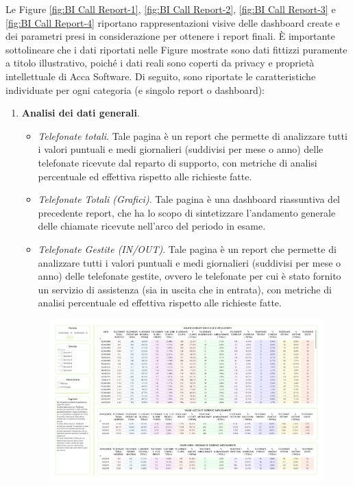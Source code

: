 Le Figure \ref{fig:BI Call Report-1}, \ref{fig:BI Call Report-2}, \ref{fig:BI Call Report-3} e \ref{fig:BI Call Report-4} riportano rappresentazioni visive delle dashboard create e dei parametri presi in considerazione per ottenere i report finali. È importante sottolineare che i dati riportati nelle Figure mostrate sono dati fittizzi puramente a titolo illustrativo, poiché i dati reali sono coperti da privacy e proprietà intellettuale di Acca Software. Di seguito, sono riportate le caratteristiche individuate per ogni categoria (e singolo report o dashboard):

\begin{enumerate}
    \item \textbf{Analisi dei dati generali}.   
        \begin{itemize}
            \item \textit{Telefonate totali}. Tale pagina  è un report che permette di analizzare tutti i valori puntuali e medi giornalieri (suddivisi per mese o anno) delle telefonate ricevute dal reparto di supporto, con metriche di analisi percentuale ed effettiva rispetto alle richieste fatte. 
            \item \textit{Telefonate Totali (Grafici)}. Tale pagina è una dashboard riassuntiva del precedente report, che ha lo scopo di sintetizzare l'andamento generale delle chiamate ricevute nell'arco del periodo in esame.
            \item \textit{Telefonate Gestite (IN/OUT)}. Tale pagina è un report che permette di analizzare tutti i valori puntuali e medi giornalieri (suddivisi per mese o anno) delle telefonate gestite, ovvero le telefonate per cui è stato fornito un servizio di assistenza (sia in uscita che in entrata), con metriche di analisi percentuale ed effettiva rispetto alle richieste fatte.  
        \end{itemize}
    \begin{figure}[H]
    \centering
    \includegraphics[width=1\linewidth]{figure/capitolo_4/BI Call Report-1.pdf}

\end{figure}
\end{enumerate}
